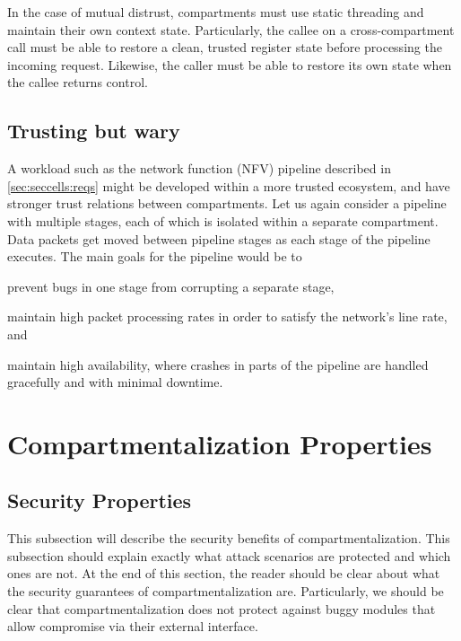 In the case of mutual distrust, compartments must use static threading 
and maintain their own context state.
Particularly, the callee on a cross-compartment call must be able to 
restore a clean, trusted register state before processing the incoming request.
Likewise, the caller must be able to restore its own state when the callee
returns control.

\subsection{Trusting but wary}
A workload such as the network function (NFV) pipeline described in 
\autoref{sec:seccells:reqs} might be developed within a more trusted
ecosystem, and have stronger trust relations between compartments.
Let us again consider a pipeline with multiple stages, each of which
is isolated within a separate compartment.
Data packets get moved between pipeline stages as each stage of the
pipeline executes.
The main goals for the pipeline would be to 
\begin{inparaenum}
      \item prevent bugs in one stage from corrupting a separate stage, 
      \item maintain high packet processing rates in order to satisfy
            the network's line rate, and
      \item maintain high availability, where crashes in parts of the
            pipeline are handled gracefully and with minimal downtime.  
\end{inparaenum}


\section{Compartmentalization Properties}
\label{sec:compreview:properties}

\subsection{Security Properties}
This subsection will describe the security benefits of compartmentalization. This subsection should explain exactly what attack scenarios are protected and which ones are not. At the end of this section, the reader should be clear about what the security guarantees of compartmentalization are. Particularly, we should be clear that compartmentalization does not protect against buggy modules that allow compromise via their external interface.


